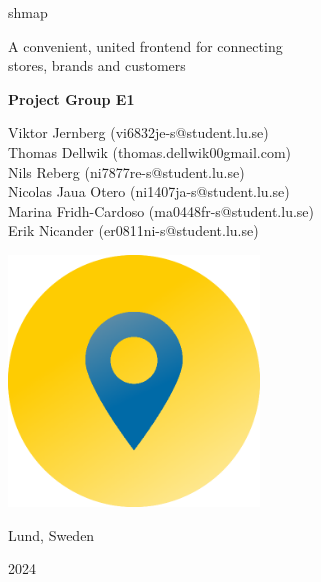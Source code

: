 \documentclass[titlepage]{article}
\def\companyName{shmap}
\begin{document}
\begin{titlepage}

\begin{center}
\vspace*{1.5cm}
    \begin{flushleft}
        {\selectfont
            {\Huge \companyName}
        
        \vspace{0.3cm}
            
        {\large A convenient, united frontend for connecting\\
        stores, brands and customers}
            
        \vspace{1.35cm}
            
        \textbf{Project Group E1}
            
        {\normalsize
        Viktor Jernberg (vi6832je-s@student.lu.se)\\
        Thomas Dellwik (thomas.dellwik00gmail.com)\\
        Nils Reberg (ni7877re-s@student.lu.se)\\
        Nicolas Jaua Otero (ni1407ja-s@student.lu.se)\\
        Marina Fridh-Cardoso (ma0448fr-s@student.lu.se)\\
        Erik Nicander (er0811ni-s@student.lu.se)
        }
            
        \vspace{2.5cm}
            
        \hfill\includegraphics[width=0.5\textwidth]{logo_gradient.png}
        
        \vspace{2.0cm}

        {\large Lund, Sweden}
    
        \vspace{0.2cm}
            
        {\large 2024}}
    \end{flushleft}
\end{center}
\end{titlepage}
\end{document}
